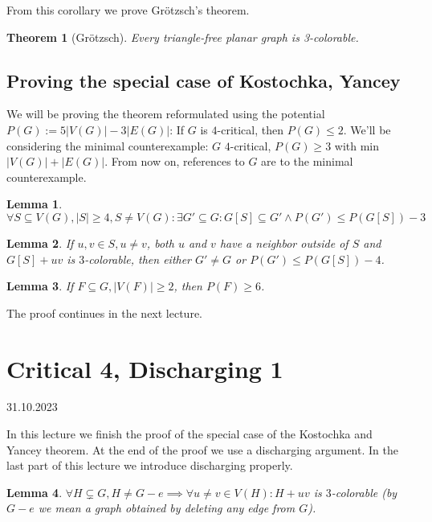 \documentclass{article}
\newtheorem*{theorem}{Theorem}
\newtheorem*{lemma}{Lemma}
\begin{document}
\noindent
From this corollary we prove Grötzsch's theorem.

\begin{theorem}[Grötzsch]
	Every triangle-free planar graph is 3-colorable.
\end{theorem}

\subsection*{Proving the special case of Kostochka, Yancey}

We will be proving the theorem reformulated using the potential $P(G) :=
5|V(G)| - 3|E(G)|$: If $G$ is $4$-critical, then $P(G) \le 2$. We'll be
considering the minimal counterexample: $G$ $4$-critical, $P(G) \ge 3$ with
min $|V(G)| + |E(G)|$. From now on, references to $G$ are to the minimal
counterexample.

\begin{lemma}
	$\forall S \subseteq V(G), |S| \ge 4, S \neq V(G):
	\exists G' \subseteq G: G[S] \subseteq G' \land P(G') \le P(G[S]) - 3$
\end{lemma}

\begin{lemma}
	If $u,v \in S, u \neq v$, both $u$ and $v$ have a neighbor outside of
	$S$ and $G[S] + uv$ is $3$-colorable, then either $G' \neq G$ or $P(G')
	\le P(G[S])-4$.
\end{lemma}

\begin{lemma}
	If $F \subseteq G, |V(F)| \ge 2$, then $P(F) \ge 6$.
\end{lemma}

\noindent
The proof continues in the next lecture.


\newpage
\section{Critical 4, Discharging 1} %
31.10.2023

\noindent
In this lecture we finish the proof of the special case of the Kostochka and
Yancey theorem. At the end of the proof we use a discharging argument. In the
last part of this lecture we introduce discharging properly.

\begin{lemma}
	$\forall H \subsetneq G, H \neq G - e \implies \forall u \neq v \in
	V(H): H + uv$ is $3$-colorable (by $G - e$ we mean a graph obtained by
	deleting any edge from $G$).
\end{lemma}
\end{document}
